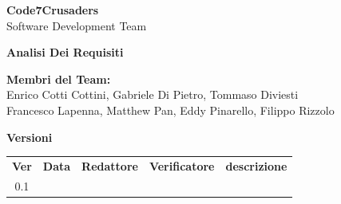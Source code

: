 \documentclass{article}
\begin{document}
\begin{titlepage}
    {\Huge \textbf{Code7Crusaders}}\\
    \vspace{0.5cm}
    {\Large Software Development Team}\\
    \vspace{2cm}
    
    \large \textbf{Analisi Dei Requisiti}
    \vspace{3.9cm}

    \textbf{Membri del Team:}\\
    Enrico Cotti Cottini, Gabriele Di Pietro, Tommaso Diviesti \\
    Francesco Lapenna, Matthew Pan, Eddy Pinarello, Filippo Rizzolo \\
    \vspace{0.5cm}
    
    \vspace{1cm}
\end{titlepage}



\newpage
\begin{center}
    \textbf{Versioni}
    \\
    \vspace{0.3cm}
    \begin{tabular}{|c|c|c|c|c|}
        \hline
        \textbf{Ver} & \textbf{Data} & \textbf{Redattore} & \textbf{Verificatore} & \textbf{descrizione}\\
        0.1 &  &  &  &  \\
        \hline
    \end{tabular}
\end{center}

\newpage
\tableofcontents
\listoftables
\listoffigures

\newpage



\newpage


\end{document}
